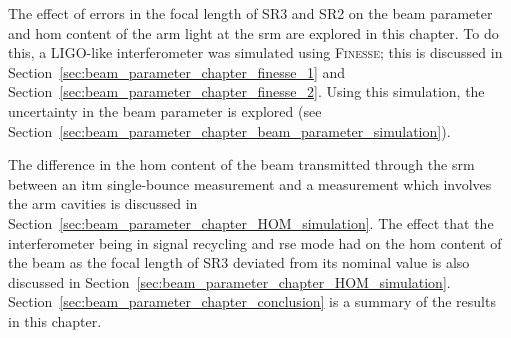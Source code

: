 \par
The effect of errors in the focal length of SR3 and SR2 on the beam parameter and \gls{hom} content of the arm light at the \gls{srm} are explored in this chapter. To do this, a LIGO-like interferometer was simulated using \textsc{Finesse}; this is discussed in Section~\ref{sec:beam_parameter_chapter_finesse_1} and Section~\ref{sec:beam_parameter_chapter_finesse_2}. Using this simulation, the uncertainty in the beam parameter is explored (see Section~\ref{sec:beam_parameter_chapter_beam_parameter_simulation}). 
\par
The difference in the \gls{hom} content of the beam transmitted through the \gls{srm} between an \gls{itm} single-bounce measurement and a measurement which involves the arm cavities is discussed in Section~\ref{sec:beam_parameter_chapter_HOM_simulation}. The effect that the interferometer being in signal recycling and \gls{rse} mode had on the \gls{hom} content of the beam as the focal length of SR3 deviated from its nominal value is also discussed in Section~\ref{sec:beam_parameter_chapter_HOM_simulation}. Section~\ref{sec:beam_parameter_chapter_conclusion} is a summary of the results in this chapter.
